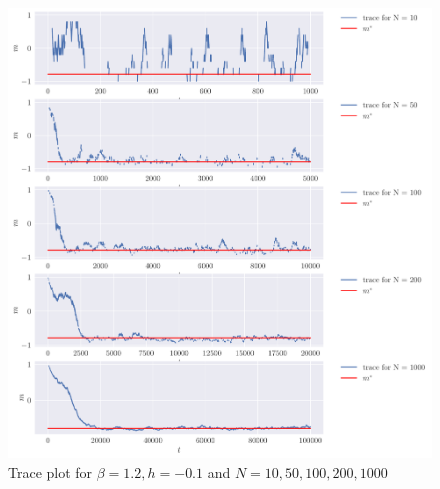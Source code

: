 \documentclass[a4paper,oneside,12pt]{article}
\begin{document}
\begin{solution}
\begin{enumerate}[(a)]
\begin{figure}
            \includegraphics[width=500pt]{hw1/hw1_3(b).pdf}
            \caption{Trace plot for $ \beta = 1.2, h = -0.1 $ and $ N = 10, 50, 100, 200, 1000 $}
        \end{figure}
\end{enumerate}
\end{solution}
\end{document}
